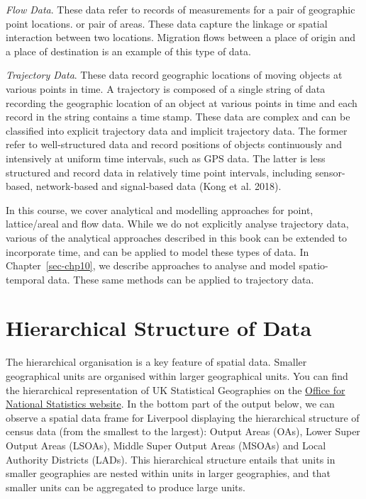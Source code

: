 \documentclass[
  letterpaper,
  DIV=11,
  numbers=noendperiod,
  oneside]{scrreprt}
\begin{document}
\emph{Flow Data}. These data refer to records of measurements for a pair
of geographic point locations. or pair of areas. These data capture the
linkage or spatial interaction between two locations. Migration flows
between a place of origin and a place of destination is an example of
this type of data.

\emph{Trajectory Data}. These data record geographic locations of moving
objects at various points in time. A trajectory is composed of a single
string of data recording the geographic location of an object at various
points in time and each record in the string contains a time stamp.
These data are complex and can be classified into explicit trajectory
data and implicit trajectory data. The former refer to well-structured
data and record positions of objects continuously and intensively at
uniform time intervals, such as GPS data. The latter is less structured
and record data in relatively time point intervals, including
sensor-based, network-based and signal-based data (Kong et al. 2018).

In this course, we cover analytical and modelling approaches for point,
lattice/areal and flow data. While we do not explicitly analyse
trajectory data, various of the analytical approaches described in this
book can be extended to incorporate time, and can be applied to model
these types of data. In Chapter~\ref{sec-chp10}, we describe approaches
to analyse and model spatio-temporal data. These same methods can be
applied to trajectory data.

\section{Hierarchical Structure of
Data}\label{hierarchical-structure-of-data}

The hierarchical organisation is a key feature of spatial data. Smaller
geographical units are organised within larger geographical units. You
can find the hierarchical representation of UK Statistical Geographies
on the
\href{https://geoportal.statistics.gov.uk/search?collection=Document&sort=name&tags=all(DOC_HRSG\%2CDEC_2020)}{Office
for National Statistics website}. In the bottom part of the output
below, we can observe a spatial data frame for Liverpool displaying the
hierarchical structure of census data (from the smallest to the
largest): Output Areas (OAs), Lower Super Output Areas (LSOAs), Middle
Super Output Areas (MSOAs) and Local Authority Districts (LADs). This
hierarchical structure entails that units in smaller geographies are
nested within units in larger geographies, and that smaller units can be
aggregated to produce large units.
\end{document}
